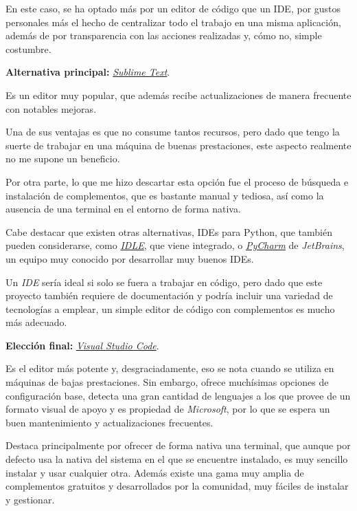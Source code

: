 En este caso, se ha optado más por un editor de código que un IDE, por gustos personales más el hecho de centralizar todo el trabajo en una misma aplicación, además de por transparencia con las acciones realizadas y, cómo no, simple costumbre.

\textbf{Alternativa principal:} \href{https://www.sublimetext.com/}{\textit{Sublime Text}}.

Es un editor muy popular, que además recibe actualizaciones de manera frecuente con notables mejoras.

Una de sus ventajas es que no consume tantos recursos, pero dado que tengo la suerte de trabajar en una máquina de buenas prestaciones, este aspecto realmente no me supone un beneficio.

Por otra parte, lo que me hizo descartar esta opción fue el proceso de búsqueda e instalación de complementos, que es bastante manual y tediosa, así como la ausencia de una terminal en el entorno de forma nativa.

Cabe destacar que existen otras alternativas, IDEs para Python, que también pueden considerarse, como \href{https://docs.python.org/3/library/idle.html}{\textit{IDLE}}, que viene integrado, o \href{https://www.jetbrains.com/es-es/pycharm/}{\textit{PyCharm}} de \textit{JetBrains}, un equipo muy conocido por desarrollar muy buenos IDEs.

Un \textit{IDE} sería ideal si solo se fuera a trabajar en código, pero dado que este proyecto también requiere de documentación y podría incluir una variedad de tecnologías a emplear, un simple editor de código con complementos es mucho más adecuado.

\textbf{Elección final:} \href{https://code.visualstudio.com/}{\textit{Visual Studio Code}}.

Es el editor más potente y, desgraciadamente, eso se nota cuando se utiliza en máquinas de bajas prestaciones. Sin embargo, ofrece muchísimas opciones de configuración base, detecta una gran cantidad de lenguajes a los que provee de un formato visual de apoyo y es propiedad de \textit{Microsoft}, por lo que se espera un buen mantenimiento y actualizaciones frecuentes.

Destaca principalmente por ofrecer de forma nativa una terminal, que aunque por defecto usa la nativa del sistema en el que se encuentre instalado, es muy sencillo instalar y usar cualquier otra. Además existe una gama muy amplia de complementos gratuitos y desarrollados por la comunidad, muy fáciles de instalar y gestionar. 

